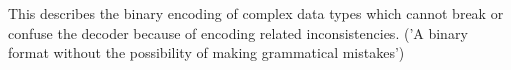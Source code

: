 This describes the binary encoding of complex
data types which cannot
break or confuse the decoder because of encoding related inconsistencies.
('A binary format without the possibility of making grammatical mistakes')
